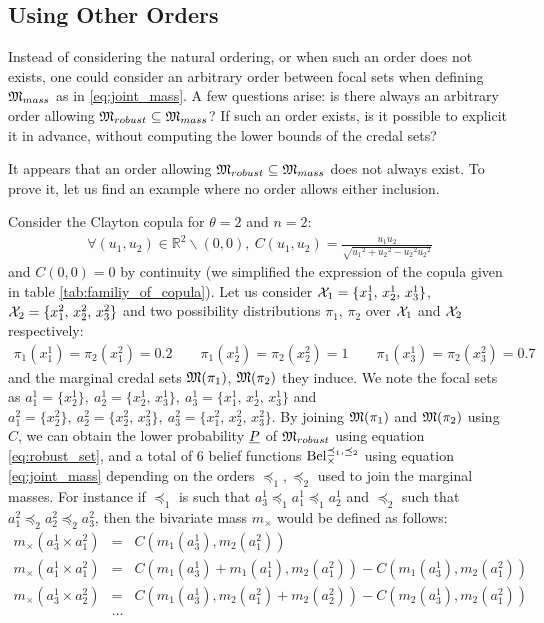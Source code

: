\subsection{Using Other Orders}
Instead of considering the natural ordering, or when such an order does not exists, one could consider an arbitrary order between focal sets when defining ${\mathfrak{M}}_{mass}$ as in \eqref{eq:joint_mass}. A few questions arise: is there always an arbitrary order allowing ${\mathfrak{M}}_{robust}\subseteq{\mathfrak{M}}_{mass}$? If such an order exists, is it possible to explicit it in advance, \ie without computing the lower bounds of the credal sets?

It appears that an order allowing ${\mathfrak{M}}_{robust}\subseteq{\mathfrak{M}}_{mass}$ does not always exist. To prove it, let us find an example where no order allows either inclusion.
\begin{example}
Consider the Clayton copula for $\theta=2$ and $n=2$:
\begin{eqnarray*}
    \forall (u_1,u_2)\in\mathbb{R}^2\backslash(0,0), ~C(u_1,u_2)=\frac{u_1u_2}{\sqrt{{u_1}^2+{u_2}^2-{u_2}^2{u_2}^2}}
\end{eqnarray*}
and $C(0,0)=0$ by continuity (we simplified the expression of the copula given in table \ref{tab:familiy_of_copula}). Let us consider ${\mathcal{X}}_1=\{x^1_1,\, x^1_2,\, x^1_3\}$, ${\mathcal{X}}_2=\{x^2_1,\, x^2_2,\, x^2_3\}$ and two possibility distributions $\pi_1$, $\pi_2$ over ${\mathcal{X}}_1$ and ${\mathcal{X}}_2$ respectively:
\begin{eqnarray*}
    \pi_1(x^1_1)=\pi_2(x^2_1)=0.2 \qquad \pi_1(x^1_2)=\pi_2(x^2_2)=1 \qquad \pi_1(x^1_3)=\pi_2(x^2_3)=0.7 
\end{eqnarray*}
and the marginal credal sets ${\mathfrak{M}}(\pi_1)$, ${\mathfrak{M}}(\pi_2)$ they induce. We note the focal sets as $a^1_1=\{x^1_2\},~a^1_2=\{x^1_2,\, x^1_3\},~a^1_3=\{x^1_1,\,x^1_2,\,x^1_3\}$ and $a^2_1=\{x^2_2\},~a^2_2=\{x^2_2,\, x^2_3\},~a^2_3=\{x^2_1,\, x^2_2,\, x^2_3\}$. By joining ${\mathfrak{M}}(\pi_1)$ and ${\mathfrak{M}}(\pi_2)$ using $C$, we can obtain the lower probability ${\underline{P}}$ of ${\mathfrak{M}}_{robust}$ using equation \eqref{eq:robust_set}, and a total of 6 belief functions ${\mathrm{Bel}}^{\preceq_1,\preceq_2}_\times$ using equation \eqref{eq:joint_mass} depending on the orders $\preceq_1, \preceq_2$ used to join the marginal masses. For instance if $\preceq_1$ is such that $a^1_3\preceq_1 a^1_1 \preceq_1 a^1_2$ and $\preceq_2$ such that $a^2_1 \preceq_2 a^2_2 \preceq_2 a^2_3$, then the bivariate mass $m_\times$ would be defined as follows:
\begin{eqnarray*}
    m_\times(a^1_3\times a^2_1) &=& C(m_1(a^1_3), m_2(a^2_1))\\
    m_\times(a^1_1\times a^2_1) &=& C(m_1(a^1_3)+m_1(a^1_1), m_2(a^2_1)) - C(m_1(a^1_3), m_2(a^2_1))\\
    m_\times(a^1_3\times a^2_2) &=& C(m_1(a^1_3), m_2(a^2_1) + m_2(a^2_2)) - C(m_2(a^1_3), m_2(a^2_1))\\
    &\dots&
\end{eqnarray*}


\end{example}
